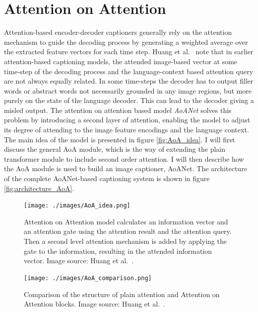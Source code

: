 \documentclass[english,twoside,openright]{HYgraduMLDS}
\begin{document}
\section{Attention on Attention}
Attention-based encoder-decoder captioners generally rely on the attention mechanism to guide the decoding process by generating a weighted average over the extracted feature vectors for each time step. Huang et al.~\cite{AoA} note that in earlier attention-based captioning models, the attended image-based vector at some time-step of the decoding process and the language-context based attention query are not always equally related. In some time-steps the decoder has to output filler words or abstract words not necessarily grounded in any image regions, but more purely on the state of the language decoder. This can lead to the decoder giving a misled output. The attention on attention based model \textit{AoANet} solves this problem by introducing a second layer of attention, enabling the model to adjust its degree of attending to the image feature encodings and the language context. The main idea of the model is presented in figure \ref{fig:AoA_idea}. I will first discuss the general AoA module, which is the way of extending the plain transformer module to include second order attention. I will then describe how the AoA module is used to build an image captioner, AoANet. The architecture of the complete AoANet-based captioning system is shown in figure \ref{fig:architecture_AoA}.

\begin{figure}
    \centering
    \begin{minipage}[t]{0.45\textwidth}
        \centering
        \texttt{[image: ./images/AoA\_idea.png]}
        \caption{Attention on Attention model calculates an information vector and an attention gate using the attention result and the attention query. Then a second level attention mechanism is added by applying the gate to the information, resulting in the attended information vector. Image source: Huang et al.~\cite{AoA}.}
        \label{fig:AoA_idea} 
    \end{minipage}\hfill
    \begin{minipage}[t]{0.45\textwidth}
        \centering
        \texttt{[image: ./images/AoA\_comparison.png]}
        \caption{Comparison of the structure of plain attention and Attention on Attention blocks. Image source: Huang et al.~\cite{AoA}.}
        \label{fig:AoA_comparison}
    \end{minipage}
\end{figure}
\end{document}
